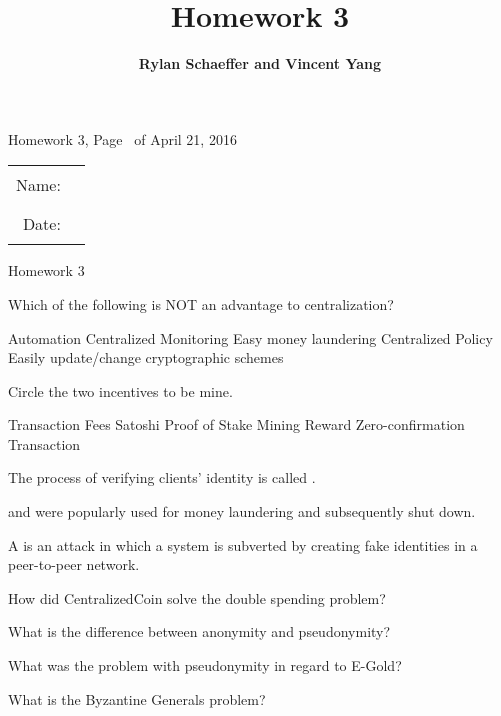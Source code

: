 \documentclass{exam}
\title{\bf Homework 3}
\author{\bf Rylan Schaeffer and Vincent Yang}
\begin{document}
\pagestyle{headandfoot}
\runningheadrule
{}
              {Homework 3, Page \thepage\ of \numpages}
              {April 21, 2016}
\firstpagefooter{}{}{}
\runningfooter{}{}{}
\begin{tabular}{rl}
Name:  & \rule{0.25\linewidth}{\linethickness} \\ 
Date:  & \rule{0.25\linewidth}{\linethickness} \\ 
\end{tabular}
\vspace{5mm}

\begin{center} 
  \Large Homework 3
\end{center} 

\begin{center}
\end{center}

\addpoints
\begin{center}
\gradetable[h][questions]
\end{center}


\begin{questions}

  \question[3]
  Which of the following is NOT an advantage to centralization?
  \begin{choices}
    \choice Automation
    \choice Centralized Monitoring
    \choice Easy money laundering
    \choice Centralized Policy
    \choice Easily update/change cryptographic schemes
  \end{choices}

  \question[3]
  Circle the two incentives to be mine.
  \begin{choices}
    \choice Transaction Fees
    \choice Satoshi
    \choice Proof of Stake
    \choice Mining Reward
    \choice Zero-confirmation Transaction
  \end{choices}

  \question[5] The process of verifying clients' identity is called . 

  \question[5]  and  were popularly used for money laundering and subsequently shut down.

  \question[5] A  is an attack in which a system is subverted by creating fake identities in a peer-to-peer network.

  \question[25] How did CentralizedCoin solve the double spending problem?
  \fillwithlines{.8in}

  \question[10] What is the difference between anonymity and pseudonymity?
  \fillwithlines{.8in}

  \question[20] What was the problem with pseudonymity in regard to E-Gold?
  \fillwithlines{1.2in}

  \question[20] What is the Byzantine Generals problem?
  \fillwithlines{1.2in}
\end{questions}
\end{document}
